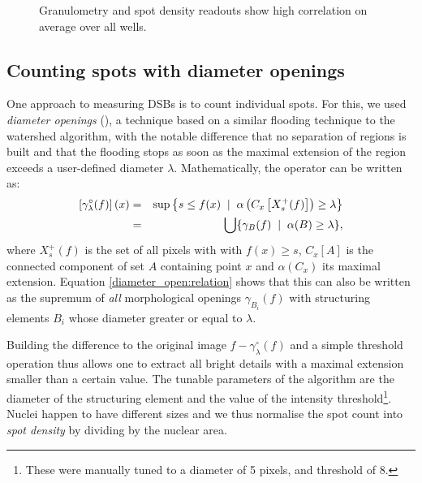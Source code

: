 \begin{figure}[ht]
\centering
{}
\caption{Granulometry and spot density readouts show high correlation on average over all wells.}
\label{fig:corr}
\end{figure}

\subsection{Counting spots with diameter openings}

One approach to measuring DSBs is to count individual spots. For this, we used \emph{diameter openings} (\cite{Walter2007}), a technique based on a similar flooding technique to the watershed algorithm, with the notable difference that no separation of regions is built and that the flooding stops as soon as the maximal extension of the region exceeds a user-defined diameter $\lambda$. Mathematically, the operator can be written as:
\begin{eqnarray} 
  \left[ \gamma^{\circ}_{\lambda}(f) \right] (x) 
    &=& \sup \left\{ s \leq f(x)
        \;\; | \;\;  \alpha \left( C_x \left[ X_s^+(f) \right] \right) \geq
        \lambda \right\} \nonumber \\ 
    &=& \bigcup \{ \gamma_B(f) \;\; | \;\; \alpha(B) \geq \lambda \},\label{diameter_open:relation}
\end{eqnarray}
where $X_s^+(f)$ is the set of all pixels with with $f(x)\geq s$, $C_x[A]$ is the connected component of set $A$ containing point $x$ and $\alpha(C_x)$ its maximal extension. Equation \ref{diameter_open:relation} shows that this can also be written as the supremum of \emph{all} morphological openings $\gamma_{B_i}(f)$ with structuring elements $B_i$ whose diameter greater or equal to $\lambda$. 

Building the difference to the original image $f-\gamma^{\circ}_{\lambda}(f)$ and a simple threshold operation thus allows one to extract all bright details with a maximal extension smaller than a certain value. The tunable parameters of the algorithm are the diameter of the structuring element and the value of the intensity threshold\footnote{These were manually tuned to a diameter of 5 pixels, and threshold of 8.}. Nuclei happen to have different sizes and we thus normalise the spot count into \emph{spot density} by dividing by the nuclear area.

